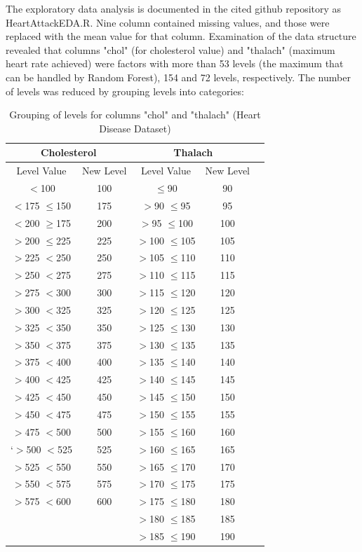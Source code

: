The exploratory data analysis is documented in the cited github repository as HeartAttackEDA.R.\newline
Nine column contained missing values, and those were replaced with the mean value for that column. Examination of the data structure revealed that columns "chol" (for cholesterol value) and "thalach" (maximum heart rate achieved) were factors with more than 53 levels (the maximum that can be handled by Random Forest), 154 and 72 levels, respectively. The number of levels was reduced by grouping levels into categories:
\begin{table}[!htbp]
\centering
\caption{Grouping of levels for columns "chol" and "thalach" (Heart Disease Dataset)}
\begin{tabular}{*5c}
  \hline
  \multicolumn{2}{c}{Cholesterol} & \multicolumn{2}{c}{Thalach} \\
  \hline
  \hline
Level Value & New Level & Level Value & New Level\\ 
  \hline
    $<$100  & 100 & $\leq$90 & 90 \\ 
   $<$175 $\leq$150 & 175 & $>$90 $\leq$95   &  95 \\ 
  $<$200 $\geq$175 & 200 & $>$95 $\leq$100  & 100  \\ 
   $>$200 $\leq$225 & 225 & $>$100 $\leq$105 & 105  \\ 
   $>$225 $<$250  & 250 & $>$105 $\leq$110 & 110  \\ 
   $>$250 $<$275  & 275 & $>$110 $\leq$115 & 115  \\ 
   $>$275 $<$300  & 300 & $>$115 $\leq$120 & 120   \\ 
   $>$300 $<$325  & 325 & $>$120 $\leq$125 & 125   \\ 
   $>$325 $<$350  & 350 & $>$125 $\leq$130 & 130  \\ 
   $>$350 $<$375  & 375 & $>$130 $\leq$135 & 135  \\ 
   $>$375 $<$400  & 400 & $>$135 $\leq$140 & 140 \\ 
   $>$400 $<$425  & 425 & $>$140 $\leq$145 & 145\\ 
   $>$425 $<$450  & 450 & $>$145 $\leq$150 & 150\\ 
   $>$450 $<$475  & 475 & $>$150 $\leq$155 & 155\\ 
   $>$475 $<$500  & 500 & $>$155 $\leq$160 & 160\\ 
  `$>$500 $<$525  & 525 & $>$160 $\leq$165 & 165 \\ 
   $>$525 $<$550  & 550 & $>$165 $\leq$170 & 170 \\ 
   $>$550 $<$575  & 575 & $>$170 $\leq$175 & 175 \\ 
   $>$575 $<$600  & 600 & $>$175 $\leq$180 & 180 \\ 
                  &     & $>$180 $\leq$185 & 185 \\ 
                  &     & $>$185 $\leq$190 & 190 \\ 
   \hline
\end{tabular}
\end{table}

